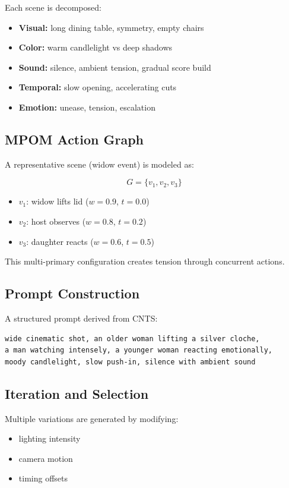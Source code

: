\documentclass[preprints,article,submit,pdftex,moreauthors,accept]{Definitions/mdpi}
\begin{document}
Each scene is decomposed:

\begin{itemize}
\item \textbf{Visual:} long dining table, symmetry, empty chairs
\item \textbf{Color:} warm candlelight vs deep shadows
\item \textbf{Sound:} silence, ambient tension, gradual score build
\item \textbf{Temporal:} slow opening, accelerating cuts
\item \textbf{Emotion:} unease, tension, escalation
\end{itemize}

\subsection{MPOM Action Graph}

A representative scene (widow event) is modeled as:

\[
G = \{v_1, v_2, v_3\}
\]

\begin{itemize}
\item $v_1$: widow lifts lid ($w=0.9$, $t=0.0$)
\item $v_2$: host observes ($w=0.8$, $t=0.2$)
\item $v_3$: daughter reacts ($w=0.6$, $t=0.5$)
\end{itemize}

This multi-primary configuration creates tension through concurrent actions.

\subsection{Prompt Construction}

A structured prompt derived from CNTS:

\begin{verbatim}
wide cinematic shot, an older woman lifting a silver cloche,
a man watching intensely, a younger woman reacting emotionally,
moody candlelight, slow push-in, silence with ambient sound
\end{verbatim}

\subsection{Iteration and Selection}

Multiple variations are generated by modifying:
\begin{itemize}
\item lighting intensity
\item camera motion
\item timing offsets
\end{itemize}
\end{document}
